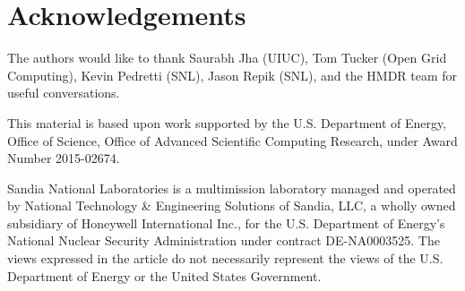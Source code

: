 \section*{Acknowledgements}
The authors would like to thank Saurabh Jha (UIUC), Tom Tucker (Open Grid Computing),
Kevin Pedretti (SNL), Jason Repik (SNL), and the HMDR team for useful conversations.

This material is based upon work supported by the U.S. Department of Energy,
Office of Science, Office of Advanced Scientific Computing Research, under Award Number 2015-02674.

Sandia National Laboratories is a multimission laboratory managed and operated
by National Technology \& Engineering Solutions of Sandia, LLC, a wholly owned
subsidiary of Honeywell International Inc., for the U.S. Department of Energy's
National Nuclear Security Administration under contract DE-NA0003525. The views
expressed in the article do not necessarily represent the views of the U.S. Department
of Energy or the United States Government.



